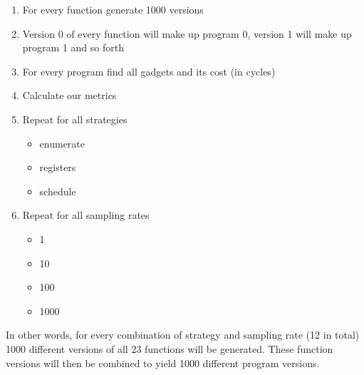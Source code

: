 \begin{enumerate}
	\item For every function generate 1000 versions
	\item Version 0 of every function will make up program 0, version 1 will make up program
		1 and so forth
	\item For every program find all gadgets and its cost (in cycles)
	\item Calculate our metrics
	\item Repeat for all strategies
		\begin{itemize}
			\item enumerate
			\item registers
			\item schedule
		\end{itemize}
	\item Repeat for all sampling rates
		\begin{itemize}
			\item 1
			\item 10
			\item 100
			\item 1000
		\end{itemize}
\end{enumerate}

In other words, for every combination of strategy and sampling rate (12 in total) 1000
different versions of all 23 functions will be generated. These function versions will
then be combined to yield 1000 different program versions.
